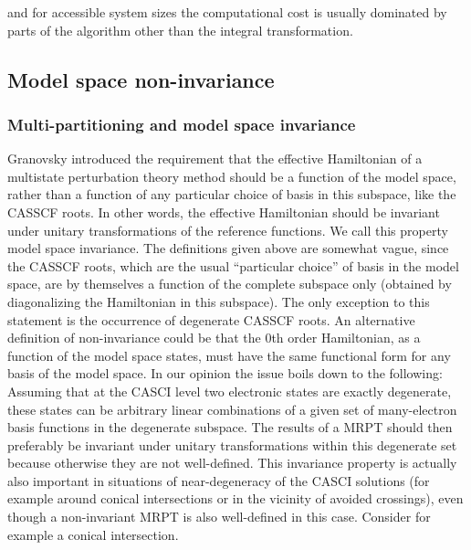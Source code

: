 and for accessible system sizes the computational cost is usually dominated by parts of the algorithm other than the integral transformation.

\subsection{Model space non-invariance}
\subsubsection{Multi-partitioning and model space invariance}
Granovsky\cite{Grano_2011_214113} introduced the requirement that the effective Hamiltonian of a multistate perturbation theory method should be a function of the model space, rather than a function of any particular choice of basis in this subspace, like the CASSCF roots. In other words, the effective Hamiltonian should be invariant under unitary transformations of the reference functions. We call this property model space invariance.
The definitions given above are somewhat vague, since the CASSCF roots, which are the usual “particular choice” of basis in the model space, are by themselves a function of the complete subspace only (obtained by diagonalizing the Hamiltonian in this subspace). The only exception to this statement is the occurrence of degenerate CASSCF roots. An alternative definition of non-invariance could be that the 0th order Hamiltonian, as a function of the model space states, must have the same functional form for any basis of the model space. In our opinion the issue boils down to the following: Assuming that at the CASCI level two electronic states are exactly degenerate, these states can be arbitrary linear combinations of a given set of many-electron basis functions in the degenerate subspace. The results of a MRPT should then preferably be invariant under unitary transformations within this degenerate set because otherwise they are not well-defined. This invariance property is actually also important in situations of near-degeneracy of the CASCI solutions (for example around conical intersections or in the vicinity of avoided crossings), even though a non-invariant MRPT is also well-defined in this case. Consider for example a conical intersection.
